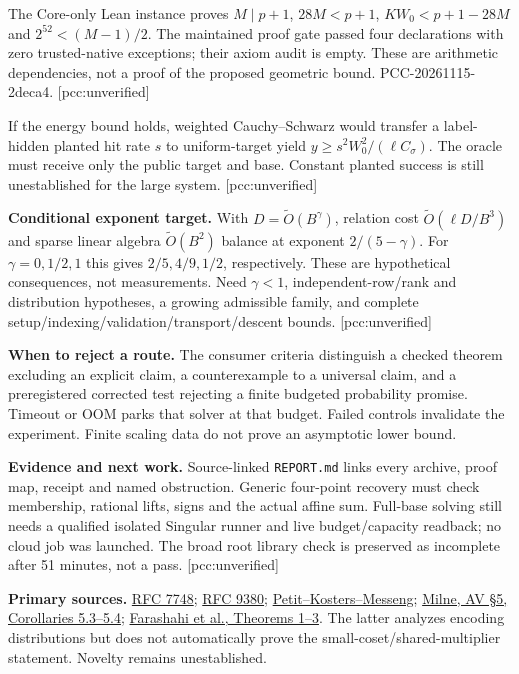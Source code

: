 \documentclass[10pt]{article}
\begin{document}
The Core-only Lean instance proves $M\mid p+1$, $28M<p+1$,
$KW_0<p+1-28M$ and $2^{52}<(M-1)/2$.
The maintained proof gate passed four declarations with zero trusted-native
exceptions; their axiom audit is empty. These are arithmetic dependencies,
not a proof of the proposed geometric bound. PCC-20261115-2deca4.
[pcc:unverified]

If the energy bound holds, weighted Cauchy--Schwarz would transfer a
label-hidden planted hit rate $s$ to uniform-target yield
$y\ge s^2W_0^2/(\ell C_\sigma)$. The oracle must receive only the public
target and base. Constant planted success is still unestablished for the
large system. [pcc:unverified]

\textbf{Conditional exponent target.}
With $D=\widetilde O(B^\gamma)$, relation cost
$\widetilde O(\ell D/B^3)$ and sparse linear algebra
$\widetilde O(B^2)$ balance at exponent $2/(5-\gamma)$.
For $\gamma=0,1/2,1$ this gives $2/5,4/9,1/2$, respectively.
These are hypothetical consequences, not measurements. Need $\gamma<1$,
independent-row/rank and distribution hypotheses, a growing admissible
family, and complete setup/indexing/validation/transport/descent bounds.
[pcc:unverified]

\textbf{When to reject a route.}
The consumer criteria distinguish a checked theorem excluding an explicit
claim, a counterexample to a universal claim, and a preregistered corrected
test rejecting a finite budgeted probability promise. Timeout or OOM parks
that solver at that budget. Failed controls invalidate the experiment.
Finite scaling data do not prove an asymptotic lower bound.

\textbf{Evidence and next work.}
Source-linked \texttt{REPORT.md} links every archive, proof map, receipt and
named obstruction. Generic four-point recovery must check membership,
rational lifts, signs and the actual affine sum. Full-base solving still
needs a qualified isolated Singular runner and live budget/capacity readback;
no cloud job was launched. The broad root library check is preserved as
incomplete after 51 minutes, not a pass. [pcc:unverified]

\textbf{Primary sources.}
\href{https://www.rfc-editor.org/rfc/rfc7748}{RFC 7748};
\href{https://www.rfc-editor.org/rfc/rfc9380}{RFC 9380};
\href{https://people.maths.ox.ac.uk/petit/files/16PKC_primeECDLP.pdf}{Petit--Kosters--Messeng};
\href{https://www.jmilne.org/math/CourseNotes/AV.pdf}{Milne, AV \S5, Corollaries 5.3--5.4};
\href{https://www.normalesup.org/~tibouchi/papers/welldistributed.pdf}{Farashahi et al., Theorems 1--3}.
The latter analyzes encoding distributions but does not automatically prove
the small-coset/shared-multiplier statement. Novelty remains unestablished.
\end{document}
